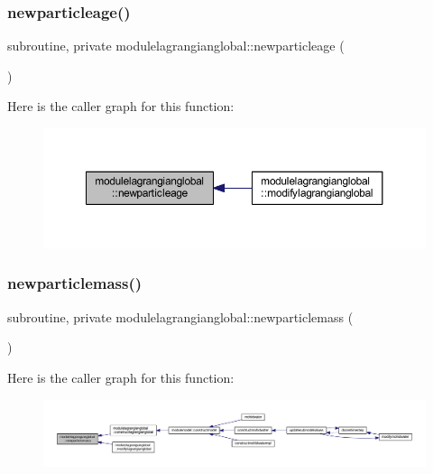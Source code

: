 \subsubsection{\texorpdfstring{newparticleage()}{newparticleage()}}
{\footnotesize\ttfamily subroutine, private modulelagrangianglobal\+::newparticleage (\begin{DoxyParamCaption}{ }\end{DoxyParamCaption})\hspace{0.3cm}{\ttfamily [private]}}

Here is the caller graph for this function\+:\nopagebreak
\begin{figure}[H]
\begin{center}
\leavevmode
\includegraphics[width=350pt]{namespacemodulelagrangianglobal_aefd30b6e40fc0d2152594e910c0c05de_icgraph}
\end{center}
\end{figure}
\mbox{\label{namespacemodulelagrangianglobal_ab7a73b07470ae9858c75d8d622eabdff}} 
\subsubsection{\texorpdfstring{newparticlemass()}{newparticlemass()}}
{\footnotesize\ttfamily subroutine, private modulelagrangianglobal\+::newparticlemass (\begin{DoxyParamCaption}{ }\end{DoxyParamCaption})\hspace{0.3cm}{\ttfamily [private]}}

Here is the caller graph for this function\+:\nopagebreak
\begin{figure}[H]
\begin{center}
\leavevmode
\includegraphics[width=350pt]{namespacemodulelagrangianglobal_ab7a73b07470ae9858c75d8d622eabdff_icgraph}
\end{center}
\end{figure}
\mbox{\label{namespacemodulelagrangianglobal_a062a888cb9da76f6463a22370b86c56a}} 
